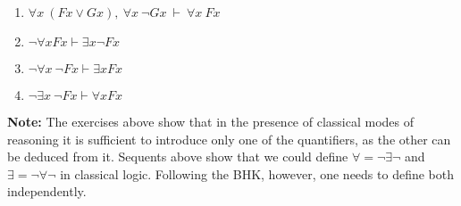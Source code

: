 \documentclass[11pt]{report}
\begin{document}
\begin{enumerate}
		\begin{enumerate}
			\item $\forall x \ (Fx \lor Gx), \ \forall x \ \lnot Gx \ \vdash \ \forall x \ Fx$
			\item $ \neg  \forall x Fx \vdash \exists x \neg Fx$
			\item $\lnot \forall x \ \lnot Fx \vdash \exists x Fx$
			\item $ \lnot \exists x \ \lnot Fx \vdash \forall x Fx$ 			
		\end{enumerate}
\end{enumerate}
	
\textbf{Note:} The exercises above show that in the presence of classical modes of reasoning it is sufficient to introduce only one of the quantifiers, as the other can be deduced from it. Sequents above show that we could define $\forall = \lnot \exists \lnot$ and $\exists = \lnot \forall \lnot$ in classical logic. Following the BHK, however, one needs to define both independently. 
\end{document}
